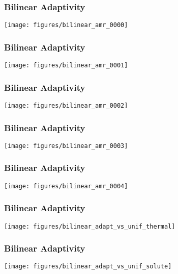 \begin{frame}
  \frametitle{Bilinear Adaptivity}
  \begin{center}
	\texttt{[image: figures/bilinear\_amr\_0000]}    
  \end{center}
\end{frame}
  
\begin{frame}
  \frametitle{Bilinear Adaptivity}
  \begin{center}
	\texttt{[image: figures/bilinear\_amr\_0001]}    
  \end{center}
\end{frame}

  \begin{frame}
  \frametitle{Bilinear Adaptivity}
  \begin{center}
	\texttt{[image: figures/bilinear\_amr\_0002]}    
  \end{center}
\end{frame}
\begin{frame}
  \frametitle{Bilinear Adaptivity}
  \begin{center}
	\texttt{[image: figures/bilinear\_amr\_0003]}    
  \end{center}
\end{frame}
\begin{frame}
  \frametitle{Bilinear Adaptivity}
  \begin{center}
	\texttt{[image: figures/bilinear\_amr\_0004]}    
  \end{center}
\end{frame}
\begin{frame}
  \frametitle{Bilinear Adaptivity}
  \begin{center}
	\texttt{[image: figures/bilinear\_adapt\_vs\_unif\_thermal]}    
  \end{center}
\end{frame}
\begin{frame}
  \frametitle{Bilinear Adaptivity}
  \begin{center}
	\texttt{[image: figures/bilinear\_adapt\_vs\_unif\_solute]}    
  \end{center}
\end{frame}





      
